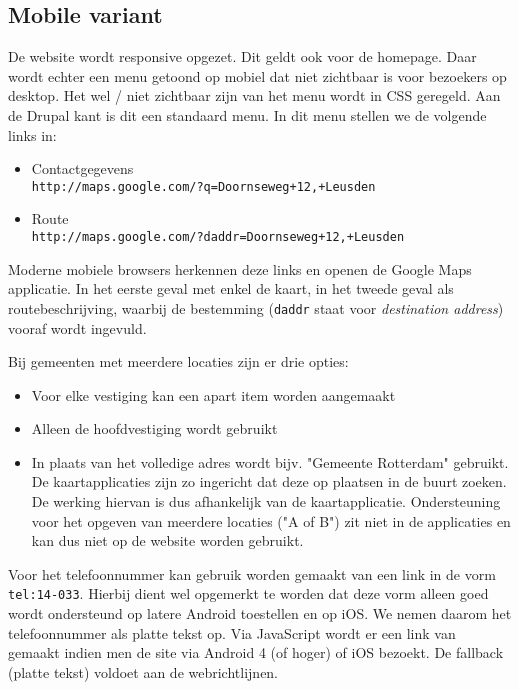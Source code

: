 \subsection{Mobile variant}\label{mobile}

De website wordt responsive opgezet. Dit geldt ook voor de homepage. Daar wordt echter een menu getoond op mobiel dat niet zichtbaar is voor bezoekers op desktop. Het wel / niet zichtbaar zijn van het menu wordt in CSS geregeld. Aan de Drupal kant is dit een standaard menu. In dit menu stellen we de volgende links in:
\begin{itemize}
\item Contactgegevens \\
\texttt{http://maps.google.com/?q=Doornseweg+12,+Leusden}
\item Route \\
\texttt{http://maps.google.com/?daddr=Doornseweg+12,+Leusden}
\end{itemize}
Moderne mobiele browsers herkennen deze links en openen de Google Maps applicatie. In het eerste geval met enkel de kaart, in het tweede geval als routebeschrijving, waarbij de bestemming (\texttt{daddr} staat voor \emph{destination address}) vooraf wordt ingevuld.

Bij gemeenten met meerdere locaties zijn er drie opties:
\begin{itemize}
\item Voor elke vestiging kan een apart item worden aangemaakt
\item Alleen de hoofdvestiging wordt gebruikt
\item In plaats van het volledige adres wordt bijv. "Gemeente Rotterdam" gebruikt. De kaartapplicaties zijn zo ingericht dat deze op plaatsen in de buurt zoeken. De werking hiervan is dus afhankelijk van de kaartapplicatie. Ondersteuning voor het opgeven van meerdere locaties ("A of B") zit niet in de applicaties en kan dus niet op de website worden gebruikt.
\end{itemize}

Voor het telefoonnummer kan gebruik worden gemaakt van een link in de vorm \texttt{tel:14-033}. Hierbij dient wel opgemerkt te worden dat deze vorm alleen goed wordt ondersteund op latere Android toestellen en op iOS. We nemen daarom het telefoonnummer als platte tekst op. Via JavaScript wordt er een link van gemaakt indien men de site via Android 4 (of hoger) of iOS bezoekt. De fallback (platte tekst) voldoet aan de webrichtlijnen.
